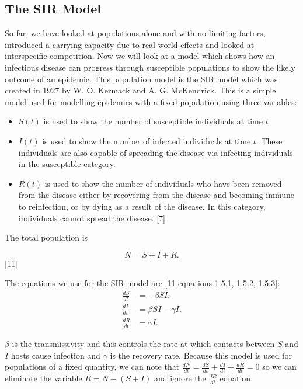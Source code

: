\documentclass{article}
\begin{document}
\subsection{\textbf{The SIR Model}}

So far, we have looked at populations alone and with no limiting factors, introduced a carrying capacity due to real world effects and looked at interspecific competition. Now we will look at a model which shows how an infectious disease can progress through susceptible populations to show the likely outcome of an epidemic. This population model is the SIR model which was created in 1927 by W. O. Kermack and A. G. McKendrick. This is a simple model used for modelling epidemics with a fixed population using three variables:

\begin{itemize}
\item $S(t)$ is used to show the number of susceptible individuals at time $t$

\item $I(t)$ is used to show the number of infected individuals at time $t$. These individuals are also capable of spreading the disease via infecting individuals in the susceptible category.

\item $R(t)$ is used to show the number of individuals who have been removed from the disease either by recovering from the disease and becoming immune to reinfection, or by dying as a result of the disease. In this category, individuals cannot spread the disease. [7]
\end{itemize}

The total population is 

$$N=S+I+R.$$[11]

The equations we use for the SIR model are [11 equations 1.5.1, 1.5.2, 1.5.3]:
\begin{align*}
\frac{dS}{dt}&=-\beta SI. \\
\frac{dI}{dt}&=\beta SI - \gamma I. \\
\frac{dR}{dt}&=\gamma I.
\end{align*}

$\beta$ is the transmissivity and this controls the rate at which contacts between $S$ and $I$ hosts cause infection and $\gamma$ is the recovery rate. Because this model is used for populations of a fixed quantity, we can note that $\frac{dN}{dt}=\frac{dS}{dt}+\frac{dI}{dt}+\frac{dR}{dt}=0$ so we can eliminate the variable $R=N-(S+I)$ and ignore the $\frac{dR}{dt}$ equation.
\end{document}
